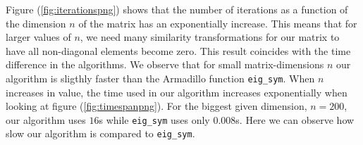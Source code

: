 \documentclass{article}
\begin{document}

  Figure (\ref{fig:iterationspng}) shows that the number of iterations as a function of the dimension $n$ of the matrix has an exponentially increase. This means that for larger values of $n$, we need many similarity transformations for our matrix to have all non-diagonal elements become zero. This result coincides with the time difference in the algorithms. We observe that for small matrix-dimensions $n$ our algorithm is sligthly faster than the Armadillo function \texttt{eig\_sym}. When $n$ increases in value, the time used in our algorithm increases exponentially when looking at figure (\ref{fig:timespanpng}). For the biggest given dimension, $n = 200$, our algorithm uses $16$s while \texttt{eig\_sym} uses only $0.008$s. Here we can observe how slow our algorithm is compared to \texttt{eig\_sym}. \\
\end{document}
